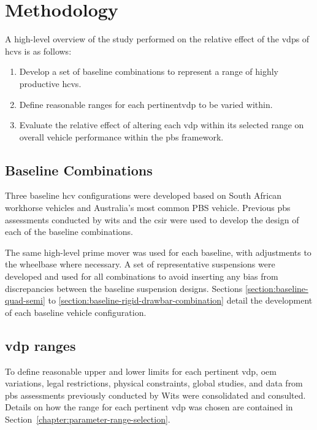 \chapter{Methodology}\label{chapter:methodology}
A high-level overview of the study performed on the relative effect of the \glspl{vdp} of \glspl{hcv} is as follows:

\begin{enumerate}
\item  Develop a set of baseline combinations to represent a range of highly productive \glspl{hcv}.
\item Define reasonable ranges for each pertinent\gls{vdp} to be varied within.
\item Evaluate the relative effect of altering each \gls{vdp} within its selected range on overall vehicle performance within the \gls{pbs} framework.
\end{enumerate}

\section{Baseline Combinations\label{section:methodbaselinecombinations}}
Three baseline \gls{hcv} configurations were developed based on South African workhorse vehicles and Australia's most common PBS vehicle.  Previous \gls{pbs} assessments conducted by \gls{wits} and the \gls{csir} were used to develop the design of each of the baseline combinations.

The same high-level prime mover was used for each baseline, with adjustments to the wheelbase where necessary. A set of representative suspensions were developed and used for all combinations to avoid inserting any bias from discrepancies between the baseline suspension designs. Sections \ref{section:baseline-quad-semi} to \ref{section:baseline-rigid-drawbar-combination} detail the development of each baseline vehicle configuration.

\section{\gls{vdp} ranges\label{section:methodvdpranges}}
To define reasonable upper and lower limits for each pertinent \gls{vdp}, \gls{oem} variations, legal restrictions, physical constraints, global studies, and data from \gls{pbs} assessments previously conducted by Wits were consolidated and consulted. Details on how the range for each pertinent \gls{vdp} was chosen are contained in Section~\ref{chapter:parameter-range-selection}.

